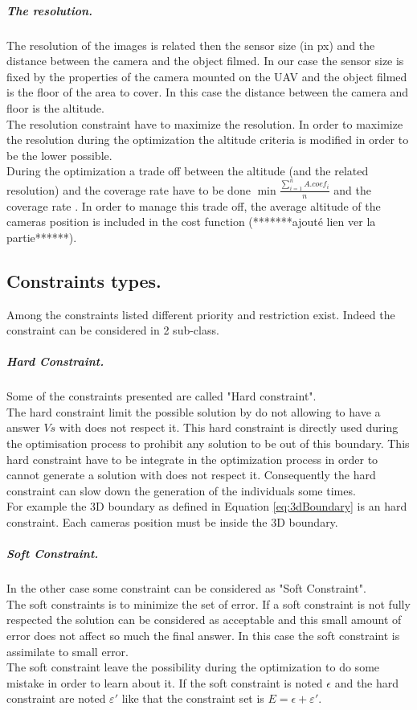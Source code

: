 \subparagraph{The resolution.}
The resolution of the images is related then the sensor size (in px) and  the distance between the camera and the object filmed. In our case the sensor size is fixed by the properties of the camera mounted on the UAV and the object filmed is the floor of the area to cover. In this case the distance between the camera and floor is the altitude. \\
The resolution constraint have to maximize the resolution. In order to maximize the resolution during the optimization the altitude criteria is modified in order to be the lower possible.\\
During the optimization a trade off between the altitude (and the related resolution) and the coverage rate have to be done $\min{\frac{\sum^n_{i=1}{A.coef_i}}{n}}$ and the coverage rate . In order to manage this trade off, the average altitude of the cameras position is included in the cost function (*******ajouté lien ver la partie******). 
 
\subsection{Constraints types.}
 
Among the constraints listed different priority and restriction exist. Indeed the constraint can be considered in 2 sub-class. 
\subparagraph{Hard Constraint.}
 Some of the constraints presented are called "Hard constraint". \\
 The hard constraint limit the possible solution by do not allowing to have a answer $Vs$ with does not respect it. This hard constraint is directly used during the optimisation process to prohibit any solution to be out of this boundary. This hard constraint have to be integrate in the optimization process in order to cannot  generate a solution with does not respect it. Consequently the hard constraint can slow down the generation of the individuals some times.\\ 
 For example the 3D boundary as defined in Equation \ref{eq:3dBoundary} is an hard constraint. Each cameras position must be inside the 3D boundary.\\
 
 \subparagraph{Soft Constraint.}
 In the other case some constraint can be considered as "Soft Constraint".\\ 
 The soft constraints is to minimize the set of error. If a soft constraint is not fully respected the solution can be considered as acceptable and this small amount of error does not affect so much the final answer. In this case the soft constraint is assimilate to small error. \\
 The soft constraint leave the possibility during the optimization to do some mistake in order to learn about it.  
 If the soft constraint is noted $\epsilon$ and the hard constraint are noted $ \varepsilon '$ like that the constraint set is $E=\epsilon+\varepsilon'$.\\
 
